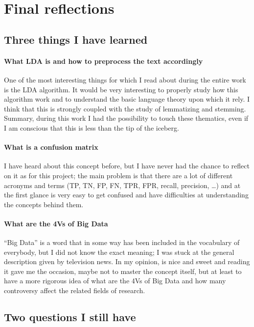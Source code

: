 \documentclass[a4paper]{article}
\begin{document}
		
		\section{Final reflections}
			\subsection{Three things I have learned}
				\paragraph{What LDA is and how to preprocess the text accordingly} One of the most interesting things for which I read about during the entire work is the LDA algorithm. It would be very interesting to properly study how this algorithm work and to understand the basic language theory upon which it rely. I think that this is strongly coupled with the study of lemmatizing and stemming. Summary, during this work I had the possibility to touch these thematics, even if I am conscious that this is less than the tip of the iceberg.
			
				\paragraph{What is a confusion matrix}
				I have heard about this concept before, but I have never had the chance to reflect on it as for this project; the main problem is that there are a lot of different acronyms and terms (TP, TN, FP, FN, TPR, FPR, recall, precision, \dots) and at the first glance is very easy to get confused and have difficulties at understanding the concepts behind them. 
				
				\paragraph{What are the 4Vs of Big Data} ``Big Data'' is a word that in some way has been included in the vocabulary of everybody, but I did not know the exact meaning; I was stuck at the general description given by television news. In my opinion, \cite{article:muller} is nice and sweet and reading it gave me the occasion, maybe not to master the concept itself, but at least to have a more rigorous idea of what are the 4Vs of Big Data and how many controversy affect the related fields of research.
				
			\subsection{Two questions I still have}
\end{document}

